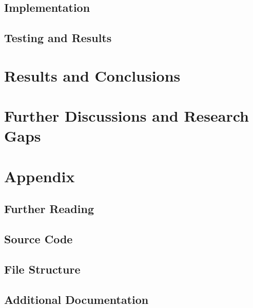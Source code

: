 \documentclass[12pt,a4paper]{report}
\begin{document}
\section{Implementation}

\section{Testing and Results}

\chapter{Results and Conclusions}
\label{chap:results}

\chapter{Further Discussions and Research Gaps}
\label{chap:discussion}

\appendix
\chapter{Appendix}
\label{chap:appendix}
\section{Further Reading}

\section{Source Code}

\section{File Structure}

\section{Additional Documentation}



\end{document}
